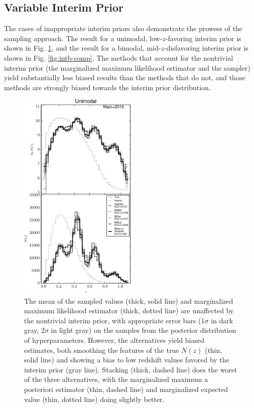 \documentclass[preprint]{aastex}
\begin{document}
\subsection{Variable Interim Prior}
\label{sec:interim}

The cases of inappropriate interim priors also demonstrate the prowess of the 
sampling approach.  The result for a unimodal, low-$z$-favoring interim prior 
is shown in Fig. \ref{fig:intu-comp}, and the result for a bimodal, 
mid-$z$-disfavoring interim prior is shown in Fig. \ref{fig:intb-comp}.  The 
methods that account for the nontrivial interim prior (the marginalized maximum 
likelihood estimator and the sampler) yield substantially less biased results 
than the methods that do not, and those methods are strongly biased towards the 
interim prior distribution.  

\begin{figure}
\includegraphics[width=0.5\textwidth]{figs/uint/comps.pdf}
\caption{The mean of the sampled values (thick, solid line) and marginalized 
maximum likelihood estimator (thick, dotted line) are unaffected by the 
nontrivial interim prior, with appropriate error bars ($1\sigma$ in dark gray, 
$2\sigma$ in light gray) on the samples from the posterior distribution of 
hyperparameters.  However, the alternatives yield biased estimates, both 
smoothing the features of the true $N(z)$ (thin, solid line) and showing a bias 
to low redshift values favored by the interim prior (gray line).  Stacking 
(thick, dashed line) does the worst of the three alternatives, with the 
marginalized maximum a posteriori estimator (thin, dashed line) and 
marginalized expected value (thin, dotted line) doing slightly better.}
\label{fig:intu-comp}
\end{figure}
\end{document}
